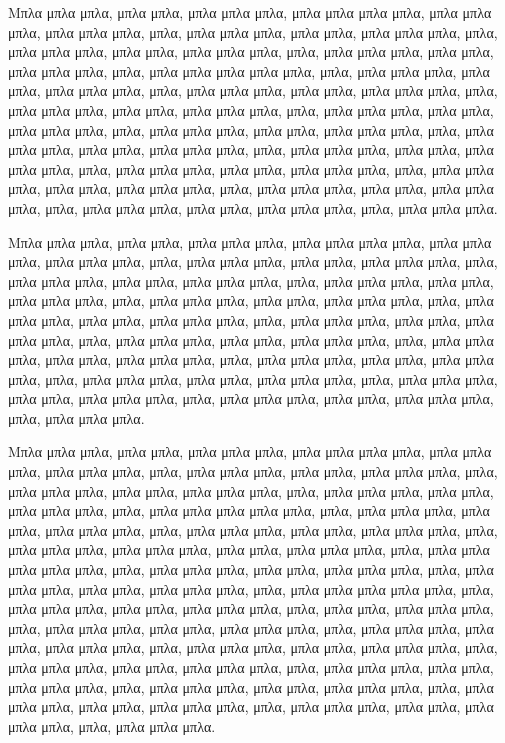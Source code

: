 \documentclass[diploma]{softlab-thesis}
\begin{document}
Μπλα μπλα μπλα, μπλα μπλα, μπλα μπλα μπλα, μπλα μπλα μπλα μπλα,
μπλα μπλα μπλα, μπλα μπλα μπλα, μπλα, μπλα μπλα μπλα, μπλα μπλα,
μπλα μπλα μπλα, μπλα, μπλα μπλα μπλα, μπλα μπλα, μπλα μπλα μπλα,
μπλα, μπλα μπλα μπλα, μπλα μπλα, μπλα μπλα μπλα, μπλα, μπλα μπλα
μπλα μπλα μπλα, μπλα, μπλα μπλα μπλα, μπλα μπλα, μπλα μπλα μπλα,
μπλα, μπλα μπλα μπλα, μπλα μπλα, μπλα μπλα μπλα, μπλα, μπλα μπλα
μπλα, μπλα μπλα, μπλα μπλα μπλα, μπλα, μπλα μπλα μπλα, μπλα μπλα,
μπλα μπλα μπλα, μπλα, μπλα μπλα μπλα, μπλα μπλα, μπλα μπλα μπλα,
μπλα, μπλα μπλα μπλα, μπλα μπλα, μπλα μπλα μπλα, μπλα, μπλα μπλα
μπλα, μπλα μπλα, μπλα μπλα μπλα, μπλα, μπλα μπλα μπλα, μπλα μπλα,
μπλα μπλα μπλα, μπλα, μπλα μπλα μπλα, μπλα μπλα, μπλα μπλα μπλα,
μπλα, μπλα μπλα μπλα, μπλα μπλα, μπλα μπλα μπλα, μπλα, μπλα μπλα
μπλα, μπλα μπλα, μπλα μπλα μπλα, μπλα, μπλα μπλα μπλα.

Μπλα μπλα μπλα, μπλα μπλα, μπλα μπλα μπλα, μπλα μπλα μπλα μπλα,
μπλα μπλα μπλα, μπλα μπλα μπλα, μπλα, μπλα μπλα μπλα, μπλα μπλα,
μπλα μπλα μπλα, μπλα, μπλα μπλα μπλα, μπλα μπλα, μπλα μπλα μπλα,
μπλα, μπλα μπλα μπλα, μπλα μπλα, μπλα μπλα μπλα, μπλα, μπλα μπλα
μπλα, μπλα μπλα, μπλα μπλα μπλα, μπλα, μπλα μπλα μπλα, μπλα μπλα,
μπλα μπλα μπλα, μπλα, μπλα μπλα μπλα, μπλα μπλα, μπλα μπλα μπλα,
μπλα, μπλα μπλα μπλα, μπλα μπλα, μπλα μπλα μπλα, μπλα, μπλα μπλα
μπλα, μπλα μπλα, μπλα μπλα μπλα, μπλα, μπλα μπλα μπλα, μπλα μπλα,
μπλα μπλα μπλα, μπλα, μπλα μπλα μπλα, μπλα μπλα, μπλα μπλα μπλα,
μπλα, μπλα μπλα μπλα, μπλα μπλα, μπλα μπλα μπλα, μπλα, μπλα μπλα
μπλα, μπλα μπλα, μπλα μπλα μπλα, μπλα, μπλα μπλα μπλα.

Μπλα μπλα μπλα, μπλα μπλα, μπλα μπλα μπλα, μπλα μπλα μπλα μπλα,
μπλα μπλα μπλα, μπλα μπλα μπλα, μπλα, μπλα μπλα μπλα, μπλα μπλα,
μπλα μπλα μπλα, μπλα, μπλα μπλα μπλα, μπλα μπλα, μπλα μπλα μπλα,
μπλα, μπλα μπλα μπλα, μπλα μπλα, μπλα μπλα μπλα, μπλα, μπλα μπλα
μπλα μπλα μπλα, μπλα, μπλα μπλα μπλα, μπλα μπλα, μπλα μπλα μπλα,
μπλα, μπλα μπλα μπλα, μπλα μπλα, μπλα μπλα μπλα, μπλα, μπλα μπλα
μπλα, μπλα μπλα μπλα, μπλα μπλα, μπλα μπλα μπλα, μπλα, μπλα μπλα
μπλα μπλα μπλα, μπλα, μπλα μπλα μπλα, μπλα μπλα, μπλα μπλα μπλα,
μπλα, μπλα μπλα μπλα, μπλα μπλα, μπλα μπλα μπλα, μπλα, μπλα μπλα
μπλα μπλα μπλα, μπλα, μπλα μπλα μπλα, μπλα μπλα, μπλα μπλα μπλα,
μπλα, μπλα μπλα, μπλα μπλα μπλα, μπλα, μπλα μπλα μπλα, μπλα μπλα,
μπλα μπλα μπλα, μπλα, μπλα μπλα μπλα, μπλα μπλα, μπλα μπλα μπλα,
μπλα, μπλα μπλα μπλα, μπλα μπλα, μπλα μπλα μπλα, μπλα, μπλα μπλα
μπλα, μπλα μπλα, μπλα μπλα μπλα, μπλα, μπλα μπλα μπλα, μπλα μπλα,
μπλα μπλα μπλα, μπλα, μπλα μπλα μπλα, μπλα μπλα, μπλα μπλα μπλα,
μπλα, μπλα μπλα μπλα, μπλα μπλα, μπλα μπλα μπλα, μπλα, μπλα μπλα
μπλα, μπλα μπλα, μπλα μπλα μπλα, μπλα, μπλα μπλα μπλα.
\end{document}
